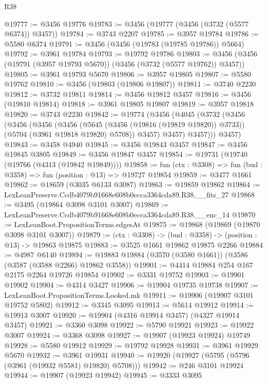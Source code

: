 \begin{lexlean}{R38}
\begin{coremodule}
@19777 := @3456 @19776
@19783 := @3456 (@19777 (@3456 (@3732 (@5577 @6374)) @3457))
@19784 := @3743 @2207
@19785 := @3957 @19784
@19786 := @5580 @6374
@19791 := @3456 (@3456 (@19783 (@19785 @19786)) @5664)
@19792 := @3961 @19784
@19793 := @19792 @19786
@19803 := @3456 (@3456 (@19791 (@3957 @19793 @5670)) (@3456 (@3732 (@5577 @19762)) @3457))
@19805 := @3961 @19793 @5670
@19806 := @3957 @19805
@19807 := @5580 @19762
@19810 := @3456 (@19803 (@19806 @19807))
@19811 := @3740 @2230
@19812 := @3732 @19811
@19814 := @3456 @19812 @3457
@19816 := @3456 (@19810 @19814)
@19818 := @3961 @19805 @19807
@19819 := @3957 @19818
@19820 := @3743 @2230
@19842 := @19774
    (@3456
      (@4045
        (@3732
          (@3456
            (@3456
              (@3456
                (@3456
                  (@5645 (@3456 (@19816 (@19819 @19820)) @3733))
                  (@5704 (@3961 @19818 @19820) @5708))
                @3457)
              @3457)
            @3457)))
      @3457)
@19843 := @3458 @4940
@19845 := @3456 @19843 @3457
@19847 := @3456 @19845 @3805
@19849 := @3456 @19847 @3457
@19854 := @19731 (@19740 (@19766 (@4313 (@19842 @19849))))
@19858 := fun (ctx : @3308) => fun (bud : @3358) => fun (position : @13) => @19727 @19854
@19859 := @3477 @1661
@19862 := @18659 (@3035 @6133 @3087)
@19863 := @19859 @19862
@19864 := LexLeanPreserve.Ccdb4079b91668e608b0ecca3364cda89.R38.__fits_27
@19868 := @3495 (@19864 @3098 @3101 @3007)
@19869 := LexLeanPreserve.Ccdb4079b91668e608b0ecca3364cda89.R38.__enc_14
@19870 := LexLeanBoot.PropositionTerms.edgesAt
@19875 := @19868 (@19869 (@19870 @3098 @3101 @3007))
@19879 := (ctx : @3308) -> (bud : @3358) -> (position : @13) -> @19863 @19875
@19883 := @3525 @1661 @19862 @19875 @2266
@19884 := @4987 @6140
@19894 := @19883 @19884 (@3570 (@3580 @1661)) (@3586 (@3587 (@3588 @2266) @19862 @3558))
@19901 := @4414 @19884 @254 @167 @2175 @2264 @19726 @19854
@19902 := @3331 @19752
@19903 := @19901 @19902
@19904 := @4314 @3427
@19906 := @19904 @19735 @19738
@19907 := LexLeanBoot.PropositionTerms.Looked.mk
@19911 := @19906 (@19907 @3101 @19752 @5802)
@19912 := @3345 @3095
@19913 := @5614 @19912
@19914 := @19913 @3007
@19920 := @19904 (@4316 @19914 @3457) (@4327 @19914 @3457)
@19921 := @3360 @3098
@19922 := @5790 @19921
@19923 := @19922 @3007
@19924 := @3368 @3098
@19927 := @19907 (@19923 @19924) @19749
@19928 := @5580 @19912
@19929 := @19792 @19928
@19931 := @3961 @19929 @5670
@19932 := @3961 @19931
@19940 := @19920 (@19927 (@5795 (@5796 (@3961 (@19932 @5581) @19820) @5708)))
@19942 := @246 @3101 @19924
@19944 := @19907 (@19923 @19942)
@19945 := @3333 @3095

\end{coremodule}
\end{lexlean}
